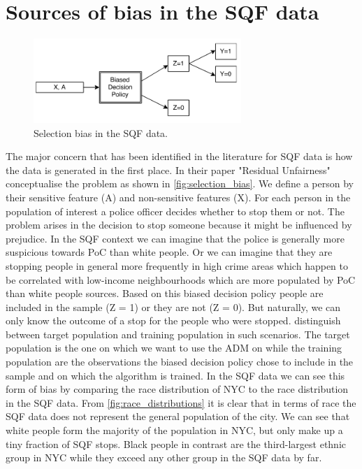 \section*{Sources of bias in the SQF data}
\begin{figure}
    \includegraphics[width=0.7\textwidth]{../figures/selection_bias.png}
    \caption{Selection bias in the SQF data.}
    \label{fig:selection_bias}
\end{figure}
The major concern that has been identified in the literature for SQF data is how the data is generated in the first place. In their paper "Residual Unfairness" \cite{kallus} conceptualise the problem as shown in \autoref{fig:selection_bias}.
We define a person by their sensitive feature (A) and non-sensitive features (X). For each person in the population of interest a police officer decides whether to stop them or not. The problem arises in the decision to stop someone because it might be influenced by prejudice. In the SQF context we can imagine that the police is generally more suspicious towards PoC than white people. Or we can imagine that they are stopping people in general more frequently in high crime areas which happen to be correlated with low-income neighbourhoods which are more populated by PoC than white people {\color{red}sources}. Based on this biased decision policy people are included in the sample (Z = 1) or they are not (Z = 0). But naturally, we can only know the outcome of a stop for the people who were stopped.
\cite{kallus} distinguish between target population and training population in such scenarios. The target population is the one on which we want to use the ADM on while the training population are the observations the biased decision policy chose to include in the sample and on which the algorithm is trained.
In the SQF data we can see this form of bias by comparing the race distribution of NYC to the race distribution in the SQF data. From \autoref{fig:race_distributions} it is clear that in terms of race the SQF data does not represent the general population of the city. We can see that white people form the majority of the population in NYC, but only make up a tiny fraction of SQF stops. Black people in contrast are the third-largest ethnic group in NYC while they exceed any other group in the SQF data by far.
